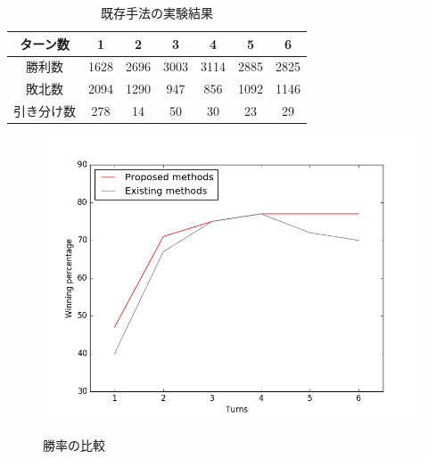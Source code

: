 \begin{table}[]
\begin{center}
	\caption{既存手法の実験結果}
	\label{tbl:r2}
	\begin{tabular}{|c|c|c|c|c|c|c|}
		\hline
		 ターン数　& 1 & 2 &3&4&5&6\\
		\hline
		勝利数	& 1628&2696&3003&3114&2885&2825 \\
		敗北数&	2094&1290&947&856&1092&1146 \\
		引き分け数 &278&14&50&30&23&29 \\
		\hline
	\end{tabular}
\end{center}
\end{table}



\begin{figure}[]
\begin{center}
   \includegraphics[scale=0.8]{./koki/w.png} \\
   \caption{勝率の比較}
\end{center}
\label{fig:w}
\end{figure}

